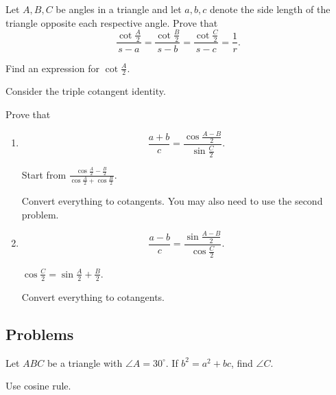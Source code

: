 \documentclass[../jarvis.tex]{subfiles}
\begin{document}
 Let $A,B,C$ be angles in a triangle and let $a,b,c$ denote the side length of the triangle opposite each respective angle. Prove that 
$$\frac{\cot{\frac{A}{2}}}{s-a}=\frac{\cot{\frac{B}{2}}}{s-b}=\frac{\cot{\frac{C}{2}}}{s-c}=\frac{1}{r}.$$
\begin{hints}
    \begin{hint}
        Find an expression for $\cot{\frac{A}{2}}.$
    \end{hint}
    \begin{hint}
        Consider the triple cotangent identity.
    \end{hint}
\end{hints}

 Prove that
\begin{enumerate}
    \item $$\frac{a+b}{c}=\frac{\cos{\frac{A-B}{2}}}{\sin{\frac{C}{2}}}.$$
    \begin{hints}
        \begin{hint}
            Start from $\frac{\cos{\frac{A}{2}-\frac{B}{2}}}{\cos{\frac{A}{2}}+\cos{\frac{B}{2}}}.$
        \end{hint}
        \begin{hint}
            Convert everything to cotangents. You may also need to use the second problem. 
        \end{hint}
    \end{hints}
    \item $$\frac{a-b}{c}=\frac{\sin{\frac{A-B}{2}}}{\cos{\frac{C}{2}}}.$$
    \begin{hints}
        \begin{hint}
            $\cos{\frac{C}{2}}=\sin{\frac{A}{2}+\frac{B}{2}}$.
        \end{hint}
        \begin{hint}
            Convert everything to cotangents.
        \end{hint}
    \end{hints}
\end{enumerate}

\subsection{Problems}
\problem[2017 SMO(O) P13]Let $ABC$ be a triangle with $\angle A=30^{\circ}$. If $b^2=a^2+bc$, find $\angle C$.
\begin{hints}
    \begin{hint}
        Use cosine rule.
    \end{hint}
\end{hints}
\end{document}
